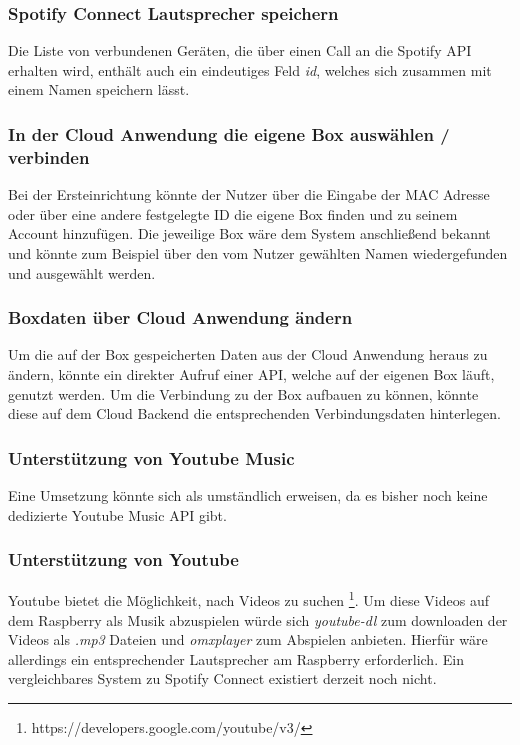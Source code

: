 \documentclass[10pt, a4paper, draft]{article}
\begin{document}
\subsubsection{Spotify Connect Lautsprecher speichern}
Die Liste von verbundenen Geräten, die über einen Call an die Spotify API erhalten wird, enthält auch ein eindeutiges Feld \textit{id}, welches sich zusammen mit einem Namen speichern lässt.

\subsubsection{In der Cloud Anwendung die eigene Box auswählen / verbinden}
Bei der Ersteinrichtung könnte der Nutzer über die Eingabe der MAC Adresse oder über eine andere festgelegte ID die eigene Box finden und zu seinem Account hinzufügen. Die jeweilige Box wäre dem System anschließend bekannt und könnte zum Beispiel über den vom Nutzer gewählten Namen wiedergefunden und ausgewählt werden.

\subsubsection{Boxdaten über Cloud Anwendung ändern}
Um die auf der Box gespeicherten Daten aus der Cloud Anwendung heraus zu ändern, könnte ein direkter Aufruf einer API, welche auf der eigenen Box läuft, genutzt werden. Um die Verbindung zu der Box aufbauen zu können, könnte diese auf dem Cloud Backend die entsprechenden Verbindungsdaten hinterlegen.
\subsubsection{Unterstützung von Youtube Music}
Eine Umsetzung könnte sich als umständlich erweisen, da es bisher noch keine dedizierte Youtube Music API gibt.

\subsubsection{Unterstützung von Youtube}
Youtube bietet die Möglichkeit, nach Videos zu suchen \footnote{https://developers.google.com/youtube/v3/}. Um diese Videos auf dem Raspberry als Musik abzuspielen würde sich \textit{youtube-dl} zum downloaden der Videos als \textit{.mp3} Dateien und \textit{omxplayer} zum Abspielen anbieten.
Hierfür wäre allerdings ein entsprechender Lautsprecher am Raspberry erforderlich. Ein vergleichbares System zu Spotify Connect existiert derzeit noch nicht.
\end{document}
